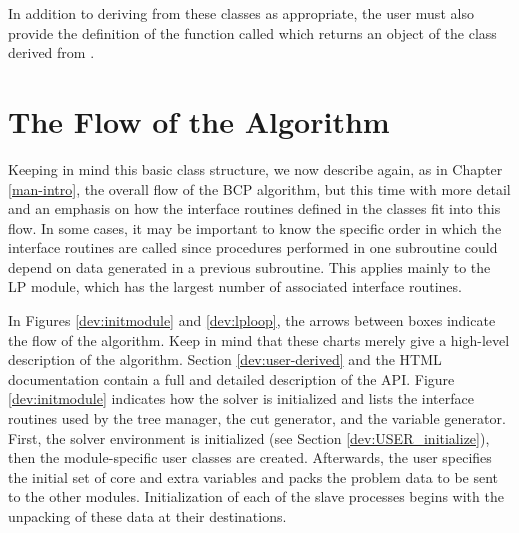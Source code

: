 In addition to deriving from these classes as appropriate, the user must also
provide the definition of the function called  which
returns an object of the 
class derived from .

\section{The Flow of the Algorithm}

Keeping in mind this basic class structure, we now describe again, as
in Chapter \ref{man-intro}, the overall flow of the BCP algorithm, but
this time with more detail and an emphasis on how the interface
routines defined in the  classes fit into this
flow. In some cases, it may be important to know the specific order in
which the interface routines are called since procedures performed in
one subroutine could depend on data generated in a previous
subroutine. This applies mainly to the LP module, which has the
largest number of associated interface routines.


In Figures \ref{dev:initmodule} and \ref{dev:lploop}, 
the arrows between boxes indicate the flow
of the algorithm. Keep in mind that these charts merely give a
high-level description of the algorithm. Section
\ref{dev:user-derived} and the HTML documentation contain a full and
detailed description of the API. Figure \ref{dev:initmodule} indicates
how the solver is initialized and lists the interface routines used by
the tree manager, the cut generator, and the variable generator.
First, the solver environment is initialized (see Section
\ref{dev:USER_initialize}), then the module-specific user classes are
created. Afterwards, the user specifies the initial set of core and
extra variables and packs the problem data to be sent to the other
modules. Initialization of each of the slave processes begins with the
unpacking of these data at their destinations.

